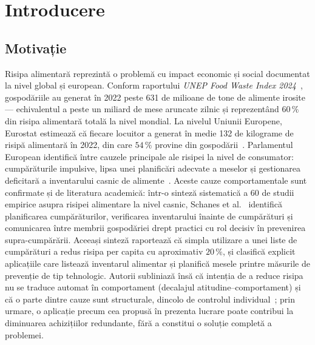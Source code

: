 \section{Introducere}\label{cap:introducere}

\subsection{Motivație}\label{sec:motivatia-intro}
Risipa alimentară reprezintă o problemă cu impact economic și social documentat la nivel global și european.
Conform raportului \textit{UNEP Food Waste Index 2024}~\cite{unepFoodWaste2024}, gospodăriile au generat în 2022 peste 631 de milioane de tone de alimente irosite --- echivalentul a peste un miliard de mese aruncate zilnic și reprezentând \(60\,\%\) din risipa alimentară totală la nivel mondial.
La nivelul Uniunii Europene, Eurostat estimează că fiecare locuitor a generat în medie 132 de kilograme de risipă alimentară în 2022, din care \(54\,\%\) provine din gospodării~\cite{eurostatFoodWaste2024}.
Parlamentul European identifică între cauzele principale ale risipei la nivel de consumator: cumpărăturile impulsive, lipsa unei planificări adecvate a meselor și gestionarea deficitară a inventarului casnic de alimente~\cite{europarlFoodWaste2025}.
Aceste cauze comportamentale sunt confirmate și de literatura academică: într-o sinteză sistematică a 60 de studii empirice asupra risipei alimentare la nivel casnic, Schanes et al.~\cite{schanes2018} identifică planificarea cumpărăturilor, verificarea inventarului înainte de cumpărături și comunicarea între membrii gospodăriei drept practici cu rol decisiv în prevenirea supra-cumpărării.
Aceeași sinteză raportează că simpla utilizare a unei liste de cumpărături a redus risipa per capita cu aproximativ \(20\,\%\), și clasifică explicit aplicațiile care listează inventarul alimentar și planifică mesele printre măsurile de prevenție de tip tehnologic.
Autorii subliniază însă că intenția de a reduce risipa nu se traduce automat în comportament (decalajul atitudine--comportament) și că o parte dintre cauze sunt structurale, dincolo de controlul individual~\cite{schanes2018}; prin urmare, o aplicație precum cea propusă în prezenta lucrare poate contribui la diminuarea achizițiilor redundante, fără a constitui o soluție completă a problemei.

